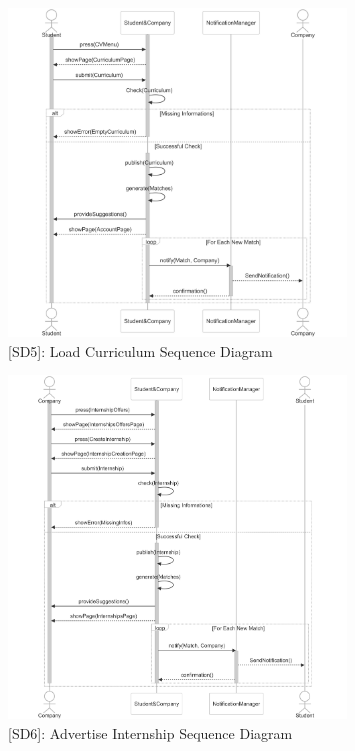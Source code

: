 \begin{figure}
    \centering
    \includegraphics[width=0.8\textwidth]{Latex/Images/RASD/SequenceDiagrams/LoadCurriculumSequenceDiagram.png}
    \caption{[SD5]: Load Curriculum Sequence Diagram}
    \label{fig:SD5}
\end{figure}
\clearpage

\begin{figure}
    \centering
    \includegraphics[width=0.8\textwidth]{Latex/Images/RASD/SequenceDiagrams/AdvertiseInternshipSequenceDiagram.png}
    \caption{[SD6]: Advertise Internship Sequence Diagram}
    \label{fig:SD6}
\end{figure}
\clearpage

